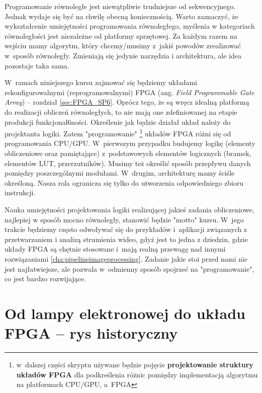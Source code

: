 Programowanie równoległe jest niewątpliwie trudniejsze od sekwencyjnego. 
Jednak wydaje się być na chwilę obecną koniecznością.
Warto zaznaczyć, że wykształcenie umiejętności programowania równoległego, myślenia w kategoriach równoległości jest niezależne od platformy sprzętowej.
Za każdym razem na wejściu mamy algorytm, który chcemy/musimy z~jakiś powodów zrealizować w~sposób równoległy. 
Zmieniają się jedynie narzędzia i architektura, ale idea pozostaje taka sama.

W~ramach niniejszego kursu zajmować się będziemy układami rekonfigurowalnymi (reprogramowalnymi) FPGA (ang. \textit{Field Programmable Gate Array}) -- rozdział \ref{sec:FPGA_SP6}. 
Oprócz tego, że są wręcz idealną platformą do realizacji obliczeń równoległych, to nie mają one zdefiniowanej na etapie produkcji funkcjonal6ności.
Określenie jak będzie działał układ należy do projektanta logiki.
Zatem "programowanie" 
\footnote{w~dalszej części skryptu używane będzie pojęcie \textbf{projektowanie struktury układów FPGA} dla podkreślenia różnic pomiędzy implementacją algorytmu na platformach CPU/GPU, a~FPGA}
układów FPGA różni się od programowania CPU/GPU.
W~pierwszym przypadku budujemy logikę (elementy obliczeniowe oraz pamiętające) z~podstawowych elementów logicznych (bramek, elementów LUT, przerzutników). 
Musimy też określić sposób przepływu danych pomiędzy poszczególnymi modułami.
W~drugim, architekturę mamy ściśle określoną. 
Nasza rola ogranicza się tylko do utworzenia odpowiedniego zbioru instrukcji.

Nauka umiejętności projektowania logiki realizującej jakieś zadania obliczeniowe, najlepiej w sposób mocno równoległy, stanowić będzie "motto" kursu.
W~jego trakcie będziemy często odwoływać się do przykładów i~aplikacji związanych z przetwarzaniem i analizą strumienia wideo, gdyż jest to jedna z dziedzin, gdzie układy FPGA są chętnie stosowane i~mają realną przewagę nad innymi rozwiązaniami \ref{cha:pipelineimageprocessing}. %
Zadanie jakie stoi przed nami nie jest najłatwiejsze, ale pozwala w~odmienny sposób spojrzeć na "programowanie", co jest bardzo rozwijające.
 
 

\section{Od lampy elektronowej do układu FPGA -- rys historyczny}

